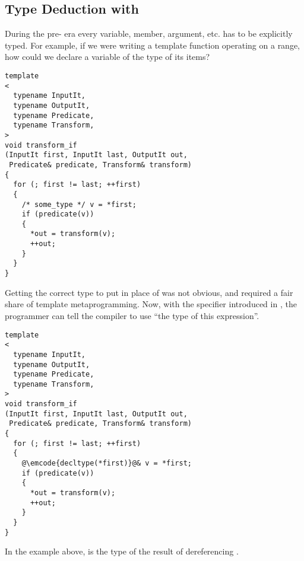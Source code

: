 \subsection{Type Deduction with }
\label{decltype}

\problemtitle

During the pre- era every variable, member, argument, etc. has
to be explicitly typed. For example, if we were writing a template
function operating on a range, how could we declare a variable of the
type of its items?

\begin{lstlisting}
template
<
  typename InputIt,
  typename OutputIt,
  typename Predicate,
  typename Transform,
>
void transform_if
(InputIt first, InputIt last, OutputIt out,
 Predicate& predicate, Transform& transform)
{
  for (; first != last; ++first)
  {
    /* some_type */ v = *first;
    if (predicate(v))
    {
      *out = transform(v);
      ++out;
    }
  }
}
\end{lstlisting}

\solutiontitle
Getting the correct type to put in place of  was not
obvious, and required a fair share of template metaprogramming. Now,
with the  specifier introduced in , the
programmer can tell the compiler to use ``the type of this
expression''.


\begin{lstlisting}
template
<
  typename InputIt,
  typename OutputIt,
  typename Predicate,
  typename Transform,
>
void transform_if
(InputIt first, InputIt last, OutputIt out,
 Predicate& predicate, Transform& transform)
{
  for (; first != last; ++first)
  {
    @\emcode{decltype(*first)}@& v = *first;
    if (predicate(v))
    {
      *out = transform(v);
      ++out;
    }
  }
}
\end{lstlisting}

In the example above,  is the type of the
result of dereferencing .
